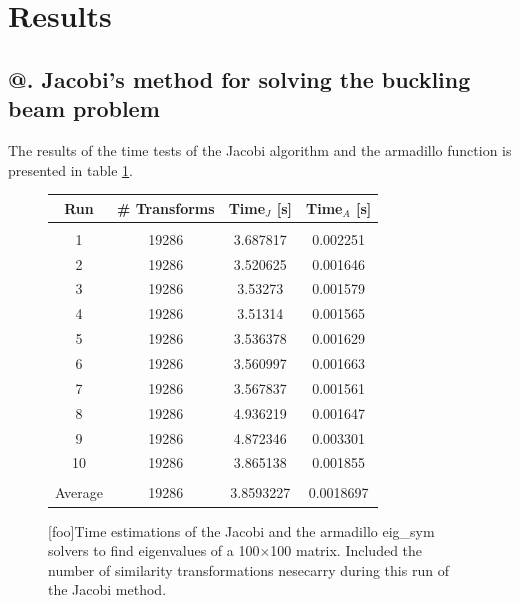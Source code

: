 \documentclass[%
reprint,
amsmath,amssymb,
aps,
]{revtex4-1}
\makeatletter
\newcommand*{\rom}[1]{\expandafter\@slowromancap\romannumeral #1@}
\makeatother
\begin{document}
\section*{Results}
\subsection*{\rom{1}. Jacobi's method for solving the buckling beam problem} \noindent 
The results of the time tests of the Jacobi algorithm and the armadillo function is presented in table \ref{tab1}.
\begin{figure}[!h]
	\begin{tabular} {|c|c|c|c|}
		\hline
		Run & \# Transforms & Time$_J$ [s] & Time$_A$ [s] \\ 
		\hline
		&&& \\ 
		1 & 19286 & 3.687817             & 0.002251            \\ 
		2 & 19286 & 3.520625             & 0.001646            \\ 
		3 & 19286 & 3.53273             & 0.001579            \\ 
		4 & 19286 & 3.51314             & 0.001565            \\ 
		5 & 19286 & 3.536378             & 0.001629            \\ 
		6 & 19286 & 3.560997             & 0.001663            \\ 
		7 & 19286 & 3.567837             & 0.001561            \\ 
		8 & 19286 & 4.936219             & 0.001647            \\ 
		9 & 19286 & 4.872346             & 0.003301            \\ 
		10 & 19286 & 3.865138             & 0.001855            \\ 
		\hline 
		& && \\
		Average &19286& 3.8593227&0.0018697\\ 
		\hline
	\end{tabular}
	[foo]{Time estimations of the Jacobi and the armadillo eig\_sym solvers to find eigenvalues of a 100$\times$100 matrix. Included the number of similarity transformations nesecarry during this run of the Jacobi method. \label{tab1}}
\end{figure}
\end{document}
